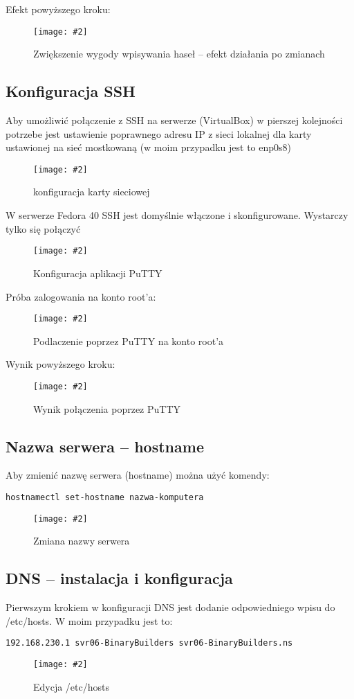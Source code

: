 \documentclass[a4paper]{article}
\newcommand*{\zdj}[2][\textwidth]{\texttt{[image: \#2]}}
\newcommand*{\fg}[4][!htb]{
      \begin{figure*}[#1]
            \zdj{#2}
            \caption[#4]{#3}
      \end{figure*}
}
\begin{document}
Efekt powyższego kroku: 
\fg{contents/OS_installation/Fedora40/26.png}{Zwiększenie wygody wpisywania haseł – efekt działania po zmianach}{Efekt działania zmiany ustawień}
\newpage

\subsection{Konfiguracja SSH}
Aby umożliwić połączenie z SSH na serwerze (VirtualBox) w pierszej kolejności potrzebe jest ustawienie poprawnego adresu IP z sieci lokalnej dla karty ustawionej na sieć mostkowaną (w moim przypadku jest to enp0s8)
\fg{contents/configuration/SSH/1.png}{konfiguracja karty sieciowej}{konfiguracja karty sieciowej}


W serwerze Fedora 40 SSH jest domyślnie włączone i skonfigurowane. Wystarczy tylko się połączyć
\fg{contents/configuration/SSH/2.png}{Konfiguracja aplikacji PuTTY}{Konfiguracja PuTTY}
\newpage

Próba zalogowania na konto root'a: 
\fg{contents/configuration/SSH/3.png}{Podlaczenie poprzez PuTTY na konto root'a}{Próba podłączenia poprzez PuTTY}

Wynik powyższego kroku:
\fg{contents/configuration/SSH/4.png}{Wynik połączenia poprzez PuTTY}{Wynik połączenia poprzez PuTTY}

\newpage

\subsection{Nazwa serwera – hostname}
Aby zmienić nazwę serwera (hostname) można użyć komendy: 
\vspace*{-5pt}
\begin{Verbatim}[frame=single]
hostnamectl set-hostname nazwa-komputera
\end{Verbatim}
\vspace*{-5pt}
\fg{contents/configuration/hostname/1.png}{Zmiana nazwy serwera}{Zmiana nazwy serwera}

\vspace*{-25pt}
\subsection{DNS – instalacja i konfiguracja}
Pierwszym krokiem w konfiguracji DNS jest dodanie odpowiedniego wpisu do /etc/hosts. W moim przypadku jest to:
\begin{Verbatim}[frame=single]
192.168.230.1 svr06-BinaryBuilders svr06-BinaryBuilders.ns
\end{Verbatim}
\fg{contents/configuration/DNS/1.png}{Edycja /etc/hosts}{Edycja /etc/hosts}
\end{document}
